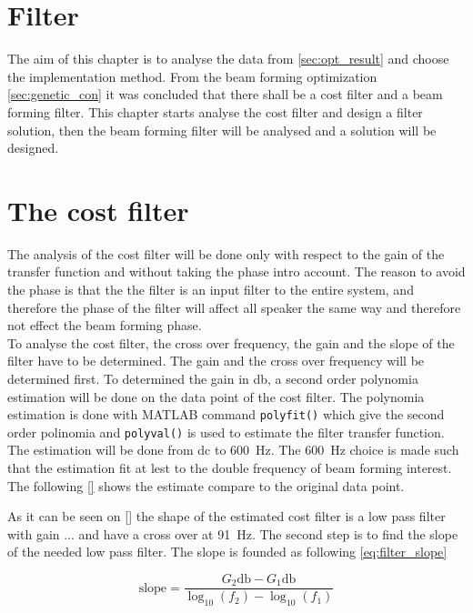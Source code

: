 \section{Filter}

The aim of this chapter is to analyse the data from \ref{sec:opt_result} and choose the implementation method. From the beam forming optimization \autoref{sec:genetic_con} it was concluded that there shall be a cost filter and a beam forming filter. This chapter starts analyse the cost filter and design a filter solution, then the beam forming filter will be analysed and a solution will be designed.


\section{The cost filter}
The analysis of the cost filter will be done only with respect to the gain of the transfer function and without taking the phase intro account. The reason to avoid the phase is that the the filter is an input filter to the entire system, and therefore the phase of the filter will affect all speaker the same way and therefore not effect the beam forming phase. \\
To analyse the cost filter, the cross over frequency, the gain and the slope of the filter have to be determined. The gain and the cross over frequency will be determined first. To determined the gain in \si{\decibel}, a second order polynomia estimation will be done on the data point of the cost filter. The polynomia estimation is done with MATLAB command \texttt{polyfit()} which give the second order polinomia and \texttt{polyval()} is used to estimate the filter transfer function. The estimation will be done from \gls{dc} to \SI{600}{\hertz}. The \SI{600}{\hertz} choice is made such that the estimation fit at lest to the double frequency of beam forming interest. The following \autoref{} shows the estimate compare to the original data point.







As it can be seen on \autoref{} the shape of the estimated cost filter is a low pass filter with gain ... and have a cross over at \SI{91}{\hertz}. The second step is to find the slope of the needed low pass filter. The slope is founded as following \autoref{eq:filter_slope}

\begin{equation}
\text{slope} = \frac{G_2\si{\decibel}-G_1\si{\decibel}}{\log_{10}{(f_2)}-\log_{10}{(f_1)}}
\end{equation}

